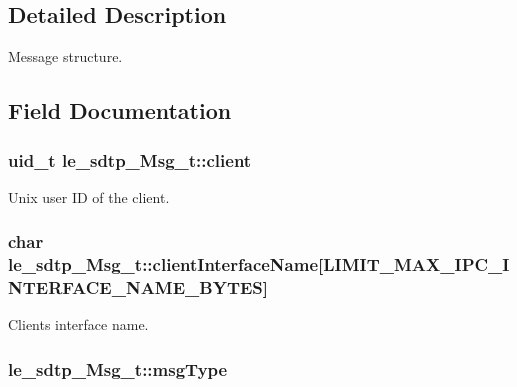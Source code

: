\subsection{Detailed Description}
Message structure. 

\subsection{Field Documentation}
\subsubsection[{\texorpdfstring{client}{client}}]{\setlength{\rightskip}{0pt plus 5cm}uid\+\_\+t le\+\_\+sdtp\+\_\+\+Msg\+\_\+t\+::client}\hypertarget{structle__sdtp___msg__t_ab5e9488fc3fa16c8b79eabd66ae5057f}{}\label{structle__sdtp___msg__t_ab5e9488fc3fa16c8b79eabd66ae5057f}


Unix user ID of the client. 

\subsubsection[{\texorpdfstring{client\+Interface\+Name}{clientInterfaceName}}]{\setlength{\rightskip}{0pt plus 5cm}char le\+\_\+sdtp\+\_\+\+Msg\+\_\+t\+::client\+Interface\+Name\mbox{[}{\bf L\+I\+M\+I\+T\+\_\+\+M\+A\+X\+\_\+\+I\+P\+C\+\_\+\+I\+N\+T\+E\+R\+F\+A\+C\+E\+\_\+\+N\+A\+M\+E\+\_\+\+B\+Y\+T\+ES}\mbox{]}}\hypertarget{structle__sdtp___msg__t_ab658e8589c5bf771677b441eade22246}{}\label{structle__sdtp___msg__t_ab658e8589c5bf771677b441eade22246}


Client\textquotesingle{}s interface name. 

\subsubsection[{\texorpdfstring{msg\+Type}{msgType}}]{ le\+\_\+sdtp\+\_\+\+Msg\+\_\+t\+::msg\+Type}\hypertarget{structle__sdtp___msg__t_a4a393dfdfbca3db78edc868efdd402ca}{}\label{structle__sdtp___msg__t_a4a393dfdfbca3db78edc868efdd402ca}


